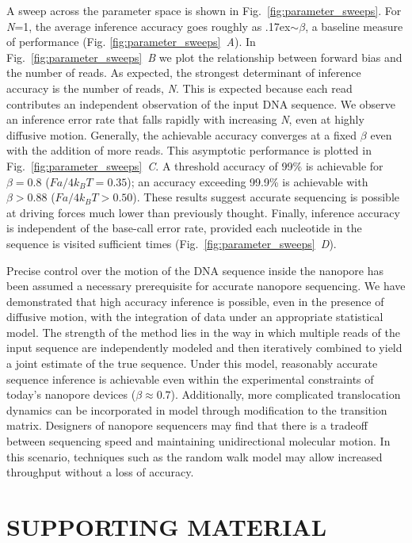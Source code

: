 \documentclass{biophys_letter}
\newcommand{\bias}{\beta}
\begin{document}
A sweep across the parameter space is shown in Fig.~\ref{fig:parameter_sweeps}.
For \emph{N}=1, the average inference accuracy goes roughly as {\raise.17ex\hbox{$\scriptstyle\sim$}}$\bias$, a baseline measure of performance (Fig. \ref{fig:parameter_sweeps}\emph{~A}).
In Fig.~\ref{fig:parameter_sweeps}\emph{~B} we plot the relationship between forward bias and the number of reads.
As expected, the strongest determinant of inference accuracy is the number of reads, \emph{N}.
This is expected because each read contributes an independent observation of the input DNA sequence.
We observe an inference error rate that falls rapidly with increasing \emph{N}, even at highly diffusive motion. 
Generally, the achievable accuracy converges at a fixed $\bias$ even with the addition of more reads.
This asymptotic performance is plotted in Fig.~\ref{fig:parameter_sweeps}\emph{~C}.
A threshold accuracy of 99\% is achievable for $\bias=0.8$ ($Fa/4k_{B}T=0.35$); an accuracy exceeding 99.9\% is achievable with $\bias>0.88$ ($Fa/4k_{B}T>0.50$).
These results suggest accurate sequencing is possible at driving forces much lower than previously thought.
Finally, inference accuracy is independent of the base-call error rate, provided each nucleotide in the sequence is visited sufficient times (Fig.~\ref{fig:parameter_sweeps}\emph{~D}).

Precise control over the motion of the DNA sequence inside the nanopore has been assumed a necessary prerequisite for accurate nanopore sequencing.
We have demonstrated that high accuracy inference is possible, even in the presence of diffusive motion, with the integration of data under an appropriate statistical model. 
The strength of the method lies in the way in which multiple reads of the input sequence are independently modeled and then iteratively combined to yield a joint estimate of the true sequence.
Under this model, reasonably accurate sequence inference is achievable even within the experimental constraints of today's nanopore devices ($\bias\approx 0.7$).
Additionally, more complicated translocation dynamics can be incorporated in model through modification to the transition matrix.
Designers of nanopore sequencers may find that there is a tradeoff between sequencing speed and maintaining unidirectional molecular motion.
In this scenario, techniques such as the random walk model may allow increased throughput without a loss of accuracy.

\section*{SUPPORTING MATERIAL}
\end{document}
